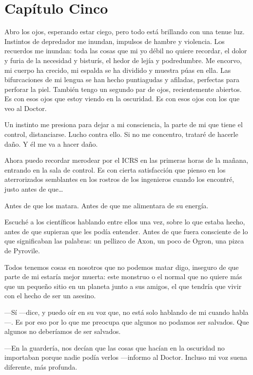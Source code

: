 \chapter*{Capítulo Cinco}


Abro los ojos, esperando estar ciego, pero todo está brillando con una
tenue luz. Instintos de depredador me inundan, impulsos de hambre y
violencia. Los recuerdos me inundan: toda las cosas que mi yo débil no
quiere recordar, el dolor y furia de la necesidad y bisturís, el hedor
de lejía y podredumbre. Me encorvo, mi cuerpo ha crecido, mi espalda se
ha dividido y muestra púas en ella. Las bifurcaciones de mi lengua se
han hecho puntiagudas y afiladas, perfectas para perforar la
piel. También tengo un segundo par de ojos, recientemente abiertos. Es
con esos ojos que estoy viendo en la oscuridad. Es con esos ojos con los
que veo al Doctor.

Un instinto me presiona para dejar a mi consciencia, la parte de mi que
tiene el control, distanciarse. Lucho contra ello. Si no me concentro,
trataré de hacerle daño. Y él me va a hacer daño.

Ahora puedo recordar merodear por el ICRS en las primeras horas de la
mañana, entrando en la sala de control. Es con cierta satisfacción que
pienso en los aterrorizados semblantes en los rostros de los ingenieros
cuando los encontré, justo antes de que\ldots{}

Antes de que los matara. Antes de que me alimentara de su energía.

Escuché a los científicos hablando entre ellos una vez, sobre lo que
estaba hecho, antes de que supieran que les podía entender. Antes de que
fuera consciente de lo que significaban las palabras: un pellizco de
Axon, un poco de Ogron, una pizca de Pyrovile.

Todos tenemos cosas en nosotros que no podemos matar digo, inseguro de
que parte de mi estaría mejor muerta: este monstruo o el normal que no
quiere más que un pequeño sitio en un planeta junto a sus amigos, el que
tendría que vivir con el hecho de ser un asesino.

---Sí ---dice, y puedo oír en su voz que, no está solo hablando de mi
cuando habla---. Es por eso por lo que me preocupa que algunos no
podamos ser salvados. Que algunos no deberíamos de ser salvados.

---En la guardería, nos decían que las cosas que hacían en la oscuridad
no importaban porque nadie podía verlos ---informo al Doctor. Incluso mi
voz suena diferente, más profunda.

